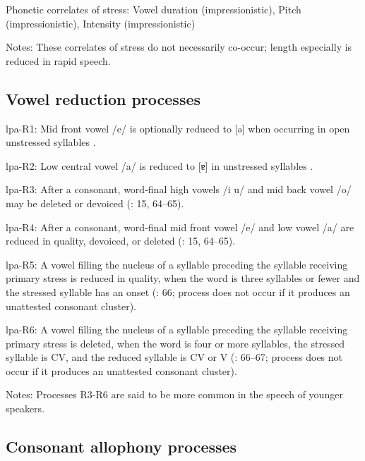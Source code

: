 {\begin{appendixdesc}
\item[Phonetic correlates of stress:] Vowel duration (impressionistic), Pitch (impressionistic), Intensity (impressionistic)

\item[Notes:] These correlates of stress do not necessarily co-occur; length especially is reduced in rapid speech.
\end{appendixdesc}
\subsection*{Vowel reduction processes}
\begin{appendixdesc}

\item[lpa-R1:] Mid front vowel /e/ is optionally reduced to [ə] when occurring in open unstressed syllables \citep[34]{Lacrampe2014}.

\item[lpa-R2:] Low central vowel /a/ is reduced to [ɐ] in unstressed syllables \citep[34--35]{Lacrampe2014}.

\item[lpa-R3:] After a consonant, word-final high vowels /i u/ and mid back vowel /o/ may be deleted or devoiced (\citealt{Lacrampe2014}: 15, 64--65).

\item[lpa-R4:] After a consonant, word-final mid front vowel /e/ and low vowel /a/ are reduced in quality, devoiced, or deleted (\citealt{Lacrampe2014}: 15, 64--65).

\item[lpa-R5:] A vowel filling the nucleus of a syllable preceding the syllable receiving primary stress is reduced in quality, when the word is three syllables or fewer and the stressed syllable has an onset (\citealt{Lacrampe2014}: 66; process does not occur if it produces an unattested consonant cluster).

\item[lpa-R6:] A vowel filling the nucleus of a syllable preceding the syllable receiving primary stress is deleted, when the word is four or more syllables, the stressed syllable is CV, and the reduced syllable is CV or V (\citealt{Lacrampe2014}: 66--67; process does not occur if it produces an unattested consonant cluster).

\item[Notes:] Processes R3-R6 are said to be more common in the speech of younger speakers.
\end{appendixdesc}
\subsection*{Consonant allophony processes}
\begin{appendixdesc}


\end{appendixdesc}}
